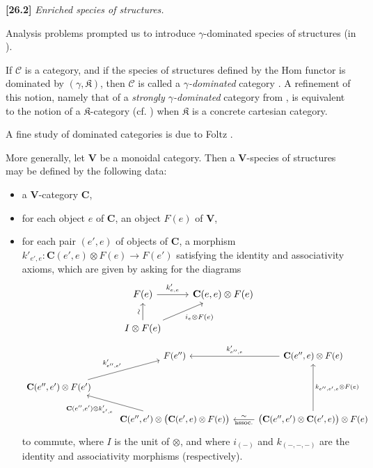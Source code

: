 \documentclass[a4paper,fleqn]{article}
\theoremstyle{plain}
\theoremstyle{definition}
\newenvironment{longcomm}[1]
  {\noindent\textbf{[#1]}\rmfamily}
  {}
\newcommand{\CC}{\mathcal{C}}
\newcommand{\KK}{\mathfrak{K}}
\begin{document}
\begin{longcomm}{26.2}
  \emph{Enriched species of structures.}

  Analysis problems prompted us to introduce $\gamma$-dominated species of structures (in \cite{comm28}).

  If $\CC$ is a category, and if the species of structures defined by the Hom functor is dominated by $(\gamma,\KK)$, then $\CC$ is called a \emph{$\gamma$-dominated} category \cite{coll77}.
  A refinement of this notion, namely that of a \emph{strongly $\gamma$-dominated} category from \cite{coll104,coll109}, is equivalent to the notion of a $\KK$-category (cf. \cite{comm31}) when $\KK$ is a concrete cartesian category.

  A fine study of dominated categories is due to Foltz \cite{comm33}.

  More generally, let $\mathbf{V}$ be a monoidal category.
  Then a {$\mathbf{V}$-species of structures} may be defined by the following data:
  \begin{itemize}
    \item a $\mathbf{V}$-category $\mathbf{C}$,

    \item for each object $e$ of $\mathbf{C}$, an object $F(e)$ of $\mathbf{V}$,

    \item for each pair $(e',e)$ of objects of $\mathbf{C}$, a morphism $k'_{e',e}\colon\mathbf{C}(e',e)\otimes F(e)\to F(e')$ satisfying the identity and associativity axioms, which are given by asking for the diagrams
    \[
      \begin{tikzcd}
        F(e)
          \ar[r,"k'_{e,e}"]
        & \mathbf{C}(e,e)\otimes F(e)
      \\I\otimes F(e)
          \ar[u,"\sim"{anchor=south,rotate=90}]
          \ar[ur,swap,"i_e\otimes F(e)"]
      \end{tikzcd}
    \]
    \[
      \begin{tikzcd}
        & F(e'')
        & \mathbf{C}(e'',e)\otimes F(e)
          \ar[l,swap,"k'_{e'',e}"]
      \\\mathbf{C}(e'',e')\otimes F(e')
          \ar[ur,"k'_{e'',e'}"]
      \\& \mathbf{C}(e'',e')\otimes\big(\mathbf{C}(e',e)\otimes F(e)\big)
          \ar[ul,"{\mathbf{C}(e'',e')\otimes k'_{e',e}}"]
        & \big(\mathbf{C}(e'',e')\otimes\mathbf{C}(e',e)\big)\otimes F(e)
          \ar[l,swap,"\sim","\mathrm{assoc.}"{below}]
          \ar[uu,swap,"k_{e'',e',e}\otimes F(e)"]
      \end{tikzcd}
    \]
    to commute, where $I$ is the unit of $\otimes$, and where $i_{(-)}$ and $k_{(-,-,-)}$ are the identity and associativity morphisms (respectively).
  \end{itemize}


\end{longcomm}
\end{document}
